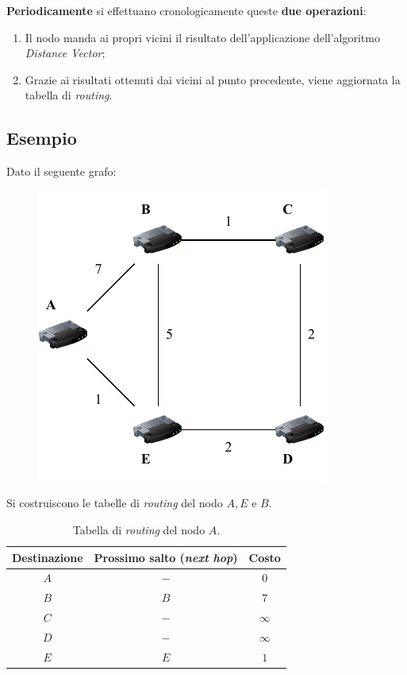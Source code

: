 \documentclass[a4paper]{article}
\begin{document}
	\noindent
	\textbf{Periodicamente} si effettuano cronologicamente queste \textbf{due operazioni}:
	\begin{enumerate}
		\item Il nodo manda ai propri vicini il risultato dell'applicazione dell'algoritmo \emph{Distance Vector};
		\item Grazie ai risultati ottenuti dai vicini al punto precedente, viene aggiornata la tabella di \emph{routing}.
	\end{enumerate}\newpage

	\subsection[Esempio]{\textcolor{Green4}{Esempio}}
	
	Dato il seguente grafo:
	\begin{figure}[!htp]
		\centering
		\includegraphics[width=.6\textwidth]{img/eg_grafo.pdf}
	\end{figure}
	
	\noindent
	Si costruiscono le tabelle di \emph{routing} del nodo $A, E$ e $B$.
	\begin{table}[!htbp]
		\centering
		\begin{tabular}{@{} c c c @{}}
			\toprule
			Destinazione	& Prossimo salto (\emph{next hop})	& Costo \\
			\midrule
			$A$				& $-$								& $0$ \\
			$B$				& $B$								& $7$ \\
			$C$				& $-$								& $\infty$ \\
			$D$				& $-$								& $\infty$ \\
			$E$				& $E$								& $1$ \\
			\bottomrule
		\end{tabular}
		\caption{Tabella di \emph{routing} del nodo $A$.}
	\end{table}
\end{document}
